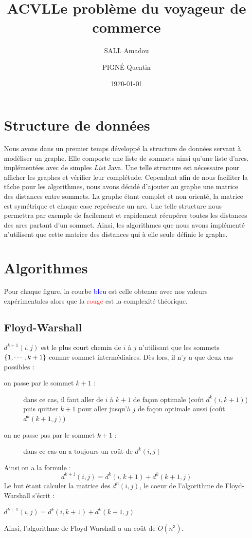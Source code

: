 \documentclass[11pt]{article} \usepackage[top=2cm, bottom=2cm, left=2cm, right=2cm]{geometry}
\title{ACVL} \title{Le problème du voyageur de commerce} \author{SALL Amadou \and PIGN\'E Quentin } \date{\today}
\begin{document}
\maketitle
\section{Structure de données}
Nous avons dans un premier temps développé la structure de données servant à modéliser un graphe. Elle comporte une liste de sommets ainsi qu'une liste d'arcs, implémentées avec de simples \textit{List} Java. Une telle structure est nécessaire pour afficher les graphes et vérifier leur complétude. Cependant afin de nous faciliter la tâche pour les algorithmes, nous avons décidé d'ajouter au graphe une matrice des distances entre sommets. La graphe étant complet et non orienté, la matrice est symétrique et chaque case représente un arc. Une telle structure nous permettra par exemple de facilement et rapidement récupérer toutes les distances des arcs partant d'un sommet. Ainsi, les algorithmes que nous avons implémenté n'utilisent que cette matrice des
distances qui à elle seule définie le graphe.
\section{Algorithmes}
Pour chaque figure, la courbe \textcolor{blue}{bleu} est celle obtenue avec nos valeurs expérimentales alors que la \textcolor{red}{rouge} est la complexité théorique.
\subsection*{Floyd-Warshall}
$d^{k+1}(i,j)$ est le plus court chemin de $i$ à $j$ n'utilisant que les sommets $\left\{1,\cdots,k+1\right\}$ comme sommet intermédiaires. Dès lors, il n'y a que deux cas possibles :
\begin{description}
    \item[on passe par le sommet $k+1$ :]  dans ce cas, il faut aller de $i$ à $k+1$ de façon optimale (coût $d^{k}(i,k+1)$) puis quitter $k+1$ pour aller jusqu'à $j$ de façon optimale aussi (coût $d^{k}(k+1,j)$)
\item[on ne passe pas par le sommet $k+1$ :] dans ce cas on a toujours un coût de $d^{k}(i,j)$
\end{description}
Ainsi on a la formule :
\begin{displaymath}
  d^{k+1}(i,j) = d^{k}(i,k+1) + d^{k}(k+1,j) 
\end{displaymath}
Le but étant calculer la matrice des $d^{n}(i,j)$, le coeur de l'algorithme de Floyd-Warshall s'écrit :
  \begin{algorithmic}[]
           \State $ d^{k+1}(i,j) = d^{k}(i,k+1) + d^{k}(k+1,j) $
           \EndFor
       \EndFor
   \EndFor
  \end{algorithmic}
Ainsi, l'algorithme de Floyd-Warshall a un coût de $O(n^3)$.
\end{document}
